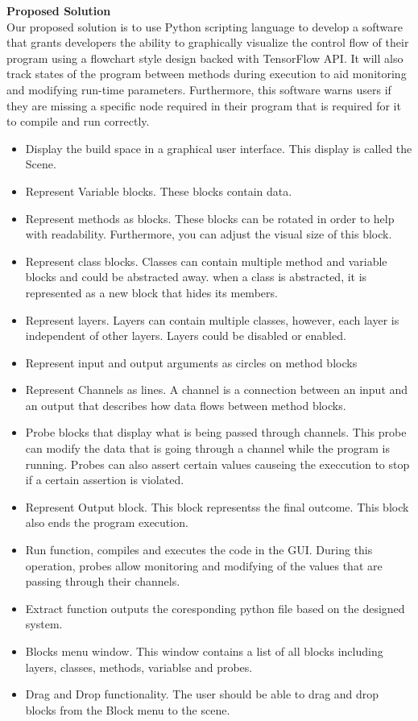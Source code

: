 \documentclass[a4paper,10pt]{IEEETran}
\begin{document}
	\noindent \textbf{Proposed Solution}\\
	\indent Our proposed solution is to use Python scripting language to develop a software that grants developers the ability to graphically visualize the control flow of their program using a flowchart style design backed with TensorFlow API.
	 It will also track states of the program between methods during execution to aid monitoring and modifying run-time parameters.
	 Furthermore, this software warns users if they are missing a specific node required in their program that is required for it to compile and run correctly.\\
	\begin{itemize}
		\item Display the build space in a graphical user interface. This display is called the Scene.
		\item Represent Variable blocks. These blocks contain data.
		\item Represent methods as blocks. These blocks can be rotated in order to help with readability. Furthermore, you can adjust the visual size of this block.
		\item Represent class blocks. Classes can contain multiple method and variable blocks and could be abstracted away.
		 when a class is abstracted, it is represented as a new block that hides its members.
		\item Represent layers. Layers can contain multiple classes, however, each layer is independent of other layers. Layers could be disabled or enabled.
		\item Represent input and output arguments as circles on method blocks
		\item Represent Channels as lines. A channel is a connection between an input and an output that describes how data flows between method blocks.
		\item Probe blocks that display what is being passed through channels.
		 This probe can modify the data that is going through a channel while the program is running.
		 Probes can also assert certain values causeing the execcution to stop if a certain assertion is violated.
		\item Represent Output block. This block representss the final outcome.
		 This block also ends the program execution.
		\item Run function, compiles and executes the code in the GUI.
		 During this operation, probes allow monitoring and modifying of the values that are passing through their channels.
		\item Extract function outputs the coresponding python file based on the designed system.
		\item Blocks menu window. This window contains a list of all blocks including layers, classes, methods, variablse and probes.
		\item Drag and Drop functionality. The user should be able to drag and drop blocks from the Block menu to the scene.
	\end{itemize}
\end{document}
